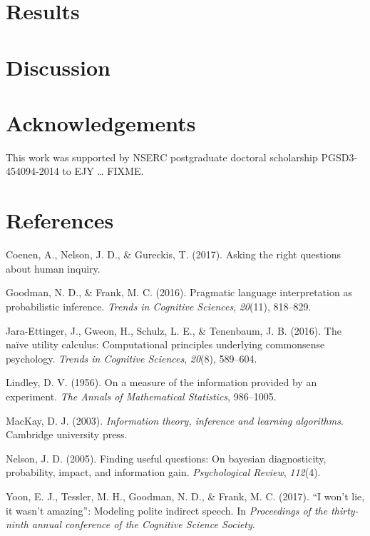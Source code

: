 \documentclass[10pt, letterpaper]{article}
\begin{document}
\section{Results}\label{results}

\section{Discussion}\label{discussion}

\section{Acknowledgements}\label{acknowledgements}

This work was supported by NSERC postgraduate doctoral scholarship
PGSD3-454094-2014 to EJY \ldots{} FIXME.

\section{References}\label{references}

\setlength{\parindent}{-0.1in} \setlength{\leftskip}{0.125in} \noindent

\hypertarget{refs}{}
\hypertarget{ref-coenen2017}{}
Coenen, A., Nelson, J. D., \& Gureckis, T. (2017). Asking the right
questions about human inquiry.

\hypertarget{ref-goodman2016}{}
Goodman, N. D., \& Frank, M. C. (2016). Pragmatic language
interpretation as probabilistic inference. \emph{Trends in Cognitive
Sciences}, \emph{20}(11), 818--829.

\hypertarget{ref-jara2016}{}
Jara-Ettinger, J., Gweon, H., Schulz, L. E., \& Tenenbaum, J. B. (2016).
The naïve utility calculus: Computational principles underlying
commonsense psychology. \emph{Trends in Cognitive Sciences},
\emph{20}(8), 589--604.

\hypertarget{ref-lindley1956}{}
Lindley, D. V. (1956). On a measure of the information provided by an
experiment. \emph{The Annals of Mathematical Statistics}, 986--1005.

\hypertarget{ref-mackay2003}{}
MacKay, D. J. (2003). \emph{Information theory, inference and learning
algorithms}. Cambridge university press.

\hypertarget{ref-nelson2005}{}
Nelson, J. D. (2005). Finding useful questions: On bayesian
diagnosticity, probability, impact, and information gain.
\emph{Psychological Review}, \emph{112}(4).

\hypertarget{ref-yoon2017}{}
Yoon, E. J., Tessler, M. H., Goodman, N. D., \& Frank, M. C. (2017). ``I
won't lie, it wasn't amazing'': Modeling polite indirect speech. In
\emph{Proceedings of the thirty-ninth annual conference of the Cognitive
Science Society}.
\end{document}
